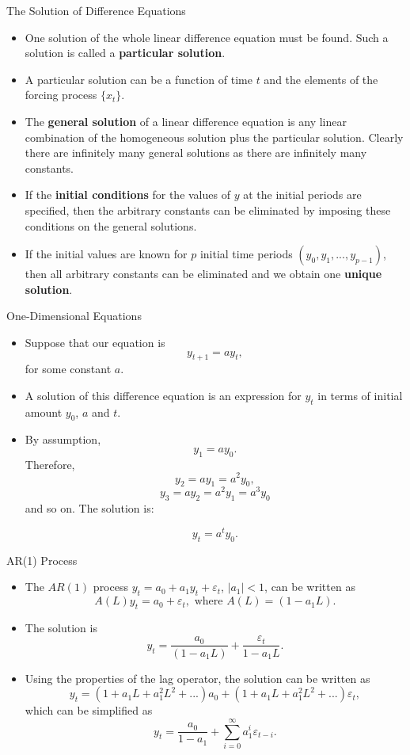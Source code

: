 \documentclass{beamer}
\begin{document}
\begin{frame}{The Solution of Difference Equations}
\begin{itemize}
    \item One solution of the whole linear difference equation must be found. Such a solution is called a \textbf{particular solution}. 
    \item A particular solution can be a function of time $t$ and the elements of the forcing process $\{x_t\}$.
    \item The \textbf{general solution } of a linear difference equation is any linear combination of the homogeneous solution plus the particular solution. Clearly there are infinitely many general solutions as there are infinitely many constants. \item If the \textbf{initial conditions} for the values of $y$ at the initial periods are specified, then the arbitrary constants can be eliminated by imposing these conditions on the general solutions. 
    \item If the initial values are known for $p$ initial time periods $(y_0,y_1,..., y_{p-1})$, then all arbitrary constants can be eliminated and we obtain one \textbf{unique solution}.
\end{itemize}
\end{frame}
\begin{frame}{One-Dimensional Equations}
   \begin{itemize}\item  Suppose that our equation is 
    \[y_{t+1}=ay_t, 
    \]
    for some constant $a$. 
    \item A solution of this difference equation is an expression for $y_t$ in terms of initial amount $y_0$, $a$ and $t$. 
    \item By assumption, 
    \[y_1=ay_0.
    \]
    Therefore, 
    \[y_2=ay_1=a^2y_0,
    \]
    \[y_3=ay_2=a^2y_1=a^3y_0
    \]
    and so on. The solution is:
    
    \[y_t=a^ty_0.
    \]
    \end{itemize}
\end{frame}
\begin{frame}{AR(1) Process}
\begin{itemize}
    \item The $AR(1)$ process $y_t=a_0+a_1y_t+\varepsilon_t $, $|a_1|<1$, can be written as 
    \[ A(L)y_t=a_0+\varepsilon_t, \text{ where } A(L)=(1-a_1L). 
    \]
    \item The solution is 
    \[y_t=\frac{a_0}{(1-a_1L)}+\frac{\varepsilon_t}{1-a_1L}. 
    \]
    \item Using the properties of the lag operator, the solution can be written as
    \[y_t=(1+a_1L+a_1^2L^2+...)a_0+(1+a_1L+a_1^2L^2+...)\varepsilon_t,
    \]
    which can be simplified as 
    \[y_t=\frac{a_0}{1-a_1}+\sum_{i=0}^\infty a_1^i\varepsilon_{t-i}.
    \]
\end{itemize}
    
\end{frame}
\end{document}
